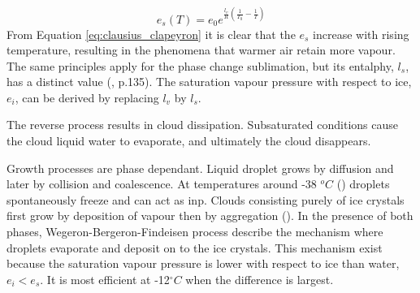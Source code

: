 \begin{equation} \label{eq:clausius_clapeyron}
    e_s\left( T \right) = e_0 e^{\frac{l_v}{R} \left( \frac{1}{T_0} - \frac{1}{T} \right) }
\end{equation}
From Equation \eqref{eq:clausius_clapeyron} it is clear that the $e_s$ increase with rising temperature, resulting in the phenomena that warmer air retain more vapour. The same principles apply for the phase change sublimation, but its entalphy, $l_s$, has a distinct value (\cite{cloud_phys_book_johanne}, p.135). The saturation vapour pressure with respect to ice, $e_i$, can be derived by replacing $l_v$ by $l_s$.

The reverse process results in cloud dissipation. Subsaturated conditions cause the cloud liquid water to evaporate, and ultimately the cloud disappears. 

Growth processes are phase dependant. Liquid droplet grows by diffusion and later by collision and coalescence. At temperatures around -38 $^oC$ (\cite{lohmann2016}) droplets spontaneously freeze and can act as \acrshort{inp}. Clouds consisting purely of ice crystals first grow by deposition of vapour then by aggregation (\cite{Fowler1996LiquidAssumptions}). In the presence of both phases, Wegeron-Bergeron-Findeisen process describe the mechanism where droplets evaporate and deposit on to the ice crystals. %
This mechanism exist because the saturation vapour pressure is lower with respect to ice than water, $e_i < e_s$. It is most efficient at -12$^{\circ}C$ when the difference is largest.



